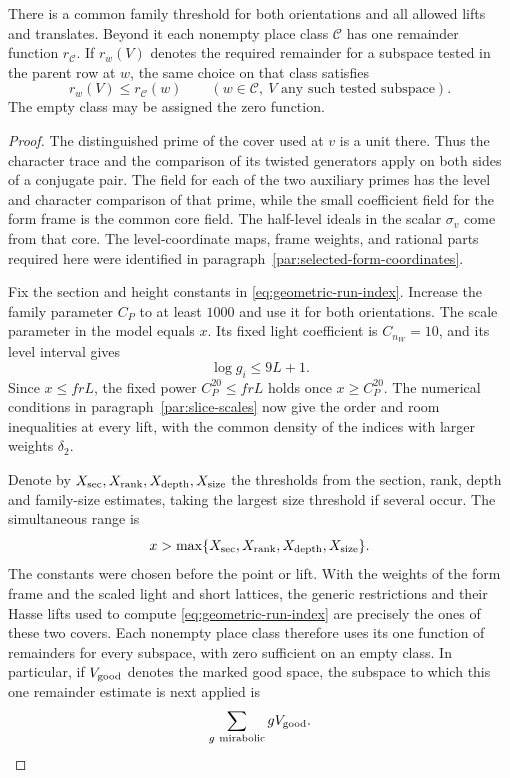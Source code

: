 \begin{proposition}\label{prop:uniform-parent-remainders}
There is a common family threshold for both orientations and all
allowed lifts and translates. Beyond it each nonempty place class
\(\mathcal C\) has one remainder function \(r_{\mathcal C}\). If
\(r_w(V)\) denotes the required remainder for a subspace tested in
the parent row at \(w\), the same choice on that class satisfies
\[
 r_w(V)\le r_{\mathcal C}(w)
 \qquad(w\in\mathcal C,\ V\text{ any such tested subspace}).
\]
The empty class may be assigned the zero function.
\end{proposition}
\begin{proof}
The distinguished prime of the cover used at \(v\) is a unit there.
Thus the character trace and
the comparison of its twisted generators apply on both sides of
a conjugate pair. The field for each of the two auxiliary primes
has the level and character comparison of that prime, while the
small coefficient field for the form frame is the common core
field. The half-level ideals in the scalar \(\sigma_v\) come from
that core. The level-coordinate maps, frame weights, and rational
parts required here were identified in
paragraph~\ref{par:selected-form-coordinates}.
\label{cor:paired-row-indices-7}

Fix the section and height constants in \eqref{eq:geometric-run-index}.
Increase the family parameter \(C_P\) to at least \(1000\) and use it for
both orientations. The scale parameter in the model equals
\(x\). Its fixed light coefficient is \(C_{n_W}=10\), and its
level interval gives 
\[
  \log g_i\le 9L+1.
\]
 Since \(x\le frL\),
the fixed power \(C_P^{20}\le frL\) holds once
\(x\ge C_P^{20}\). The numerical conditions in
paragraph~\ref{par:slice-scales} now give the order and room
inequalities at every lift, with the common density of the indices with larger weights
\(\delta_2\).

Denote by \(X_{\rm sec},X_{\rm rank},X_{\rm depth},X_{\rm size}\) the thresholds from the section, rank, depth and family-size estimates, taking the largest size threshold if several occur. The simultaneous range is
\[
  x>\max\{X_{\rm sec},X_{\rm rank},X_{\rm depth},X_{\rm size}\}.
\]
 The constants
were chosen before the point or lift. With the weights of
the form frame and the scaled light and short lattices, the
generic restrictions and their Hasse lifts used to compute
\eqref{eq:geometric-run-index} are precisely the ones of these
two covers. Each nonempty place class therefore uses its one
function of remainders for every subspace, with zero sufficient
on an empty class.
In particular, if \(V_{\rm good}\) denotes the marked good space, the subspace to which this one remainder estimate is next applied is
\[
  \sum_{g\ {\rm mirabolic}} g V_{\rm good} .
\]


\end{proof}
